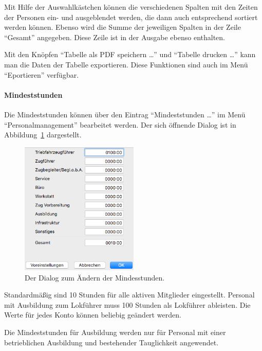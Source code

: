 Mit Hilfe der Auswahlkästchen können die verschiedenen Spalten mit den Zeiten der Personen ein- und ausgeblendet werden, die dann auch entsprechend sortiert werden können.
Ebenso wird die Summe der jeweiligen Spalten in der Zeile "`Gesamt"' angegeben.
Diese Zeile ist in der Ausgabe ebenso enthalten.


Mit den Knöpfen "`Tabelle als PDF speichern \dots"' und "`Tabelle drucken \dots"' kann man die Daten der Tabelle exportieren.
Diese Funktionen sind auch im Menü "`Eportieren"' verfügbar.


\paragraph{Mindeststunden}
Die Mindeststunden können über den Eintrag "`Mindeststunden \dots"' im Menü "`Personalmanagement"' bearbeitet werden.
Der sich öffnende Dialog ist in Abbildung~\ref{fig:personal:mindeststunden} dargestellt.

\begin{figure}[!h]
	\centering
	\includegraphics[width=0.5\textwidth]{img/personal_mindeststunden}
	\caption{Der Dialog zum Ändern der Mindesstunden.}
	\label{fig:personal:mindeststunden}
\end{figure}

Standardmäßig sind 10 Stunden für alle aktiven Mitglieder eingestellt.
Personal mit Ausbildung zum Lokführer muss 100 Stunden als Lokführer ableisten.
Die Werte für jedes Konto können beliebig geändert werden.

Die Mindeststunden für Ausbildung werden nur für Personal mit einer betrieblichen Ausbildung und bestehender Tauglichkeit angewendet.




